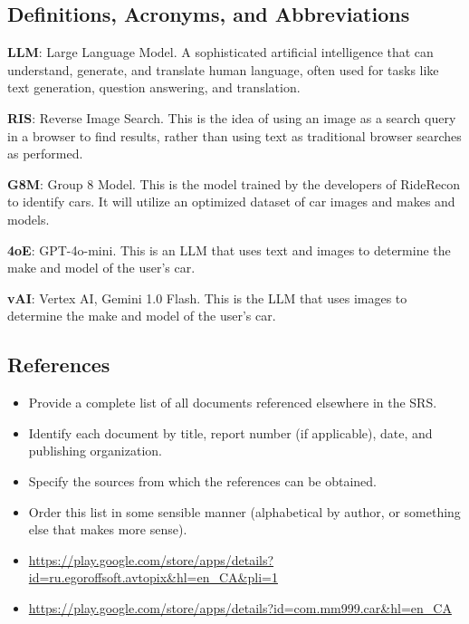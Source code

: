 \documentclass[]{article}
\begin{document}
\subsection{Definitions, Acronyms, and Abbreviations}
\label{sub:definitions_acronyms_and_abbreviations}
\textbf{LLM}: Large Language Model. A sophisticated artificial intelligence that can understand, generate, and translate human language, often used for tasks like text generation, question answering, and translation.

\textbf{RIS}: Reverse Image Search. This is the idea of using an image as a search query in a browser to find results, rather than using text as traditional browser searches as performed.

\textbf{G8M}: Group 8 Model. This is the model trained by the developers of RideRecon to identify cars. It will utilize an optimized dataset of car images and makes and models.

\textbf{4oE}: GPT-4o-mini. This is an LLM that uses text and images to determine the make and model of the user's car.

\textbf{vAI}: Vertex AI, Gemini 1.0 Flash. This is the LLM that uses images to determine the make and model of the user's car.

\subsection{References}
\label{sub:references}
\begin{itemize}
    \item Provide a complete list of all documents referenced elsewhere in the SRS.
    \item Identify each document by title, report number (if applicable), date, and publishing organization.
    \item Specify the sources from which the references can be obtained.
    \item Order this list in some sensible manner (alphabetical by author, or something else that makes more sense).
\end{itemize}

\begin{itemize}
    \item \url{https://play.google.com/store/apps/details?id=ru.egoroffsoft.avtopix&hl=en_CA&pli=1}
    \item \url{https://play.google.com/store/apps/details?id=com.mm999.car&hl=en_CA}
\end{itemize}
\end{document}
